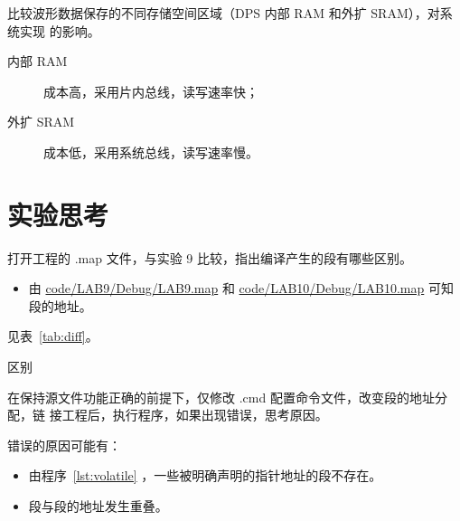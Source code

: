 \documentclass[../main]{subfiles}
\begin{document}
\begin{Exercise}
  比较波形数据保存的不同存储空间区域（DPS 内部 RAM 和外扩 SRAM），对系统实现
  的影响。
\end{Exercise}

\begin{Answer}
  \begin{description}
    \item[内部 RAM]成本高，采用片内总线，读写速率快；
    \item[外扩 SRAM]成本低，采用系统总线，读写速率慢。
  \end{description}
\end{Answer}

\section{实验思考}%
\label{sec:\arabic{chapter}thought}

\begin{Exercise}
  打开工程的 .map 文件，与实验 9 比较，指出编译产生的段有哪些区别。
\end{Exercise}

\begin{Answer}
  \begin{itemize}
    \item 由 \url{code/LAB9/Debug/LAB9.map} 和
      \url{code/LAB10/Debug/LAB10.map} 可知段的地址。
  \end{itemize}
  见表~\ref{tab:diff}。
\end{Answer}

\begin{table}[htbp]
  \centering
  \caption{区别}%
  \label{tab:diff}
  \tiny
\end{table}

\newpage

\begin{Exercise}
  在保持源文件功能正确的前提下，仅修改 .cmd 配置命令文件，改变段的地址分配，链
  接工程后，执行程序，如果出现错误，思考原因。
\end{Exercise}

\begin{Answer}
  错误的原因可能有：

  \begin{itemize}
    \item 由程序~\ref{lst:volatile} ，一些被明确声明的指针地址的段不存在。
    \item 段与段的地址发生重叠。
  \end{itemize}
\end{Answer}
\end{document}
